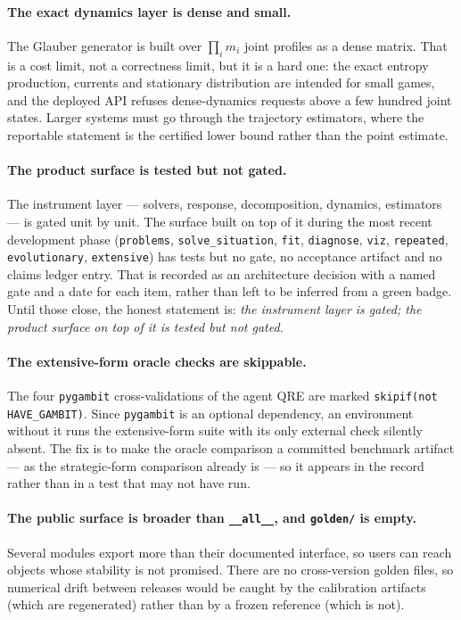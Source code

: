 \paragraph{The exact dynamics layer is dense and small.} The Glauber generator
is built over $\prod_i m_i$ joint profiles as a dense matrix. That is a cost
limit, not a correctness limit, but it is a hard one: the exact entropy
production, currents and stationary distribution are intended for small games,
and the deployed API refuses dense-dynamics requests above a few hundred joint
states. Larger systems must go through the trajectory estimators, where the
reportable statement is the certified lower bound rather than the point
estimate.

\paragraph{The product surface is tested but not gated.} The instrument layer
--- solvers, response, decomposition, dynamics, estimators --- is gated unit by
unit. The surface built on top of it during the most recent development phase
(\texttt{problems}, \texttt{solve\_situation}, \texttt{fit},
\texttt{diagnose}, \texttt{viz}, \texttt{repeated}, \texttt{evolutionary},
\texttt{extensive}) has tests but no gate, no acceptance artifact and no claims
ledger entry. That is recorded as an architecture decision with a named gate and
a date for each item, rather than left to be inferred from a green badge. Until
those close, the honest statement is: \emph{the instrument layer is gated; the
product surface on top of it is tested but not gated.}

\paragraph{The extensive-form oracle checks are skippable.} The four
\texttt{pygambit} cross-validations of the agent QRE are marked
\texttt{skipif(not HAVE\_GAMBIT)}. Since \texttt{pygambit} is an optional
dependency, an environment without it runs the extensive-form suite with its
only external check silently absent. The fix is to make the oracle comparison a
committed benchmark artifact --- as the strategic-form comparison already is ---
so it appears in the record rather than in a test that may not have run.

\paragraph{The public surface is broader than \texttt{\_\_all\_\_}, and
\texttt{golden/} is empty.} Several modules export more than their documented
interface, so users can reach objects whose stability is not promised. There are
no cross-version golden files, so numerical drift between releases would be
caught by the calibration artifacts (which are regenerated) rather than by a
frozen reference (which is not).

